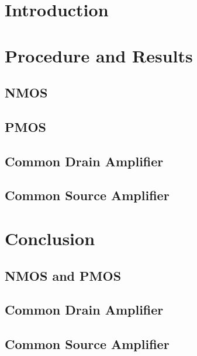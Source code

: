 \documentclass{article}
\begin{document}
\begin{titlepage}

\end{titlepage}
\section{Introduction}

\section{Procedure and Results}
\subsection{NMOS}

\subsection{PMOS}

\subsection{Common Drain Amplifier}

\subsection{Common Source Amplifier}

\section{Conclusion}
\subsection{NMOS and PMOS}

\subsection{Common Drain Amplifier}

\subsection{Common Source Amplifier}

\end{document}
